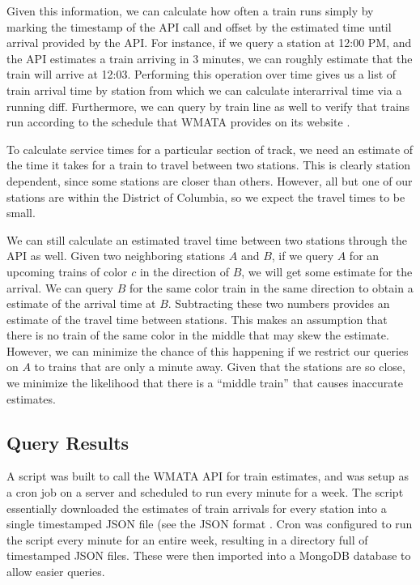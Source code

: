 \documentclass[a4paper,12pt]{article}
\begin{document}
Given this information, we can calculate how often a train runs simply by marking the timestamp of the API call and
offset by the estimated time until arrival provided by the API. For instance, if we query a station at 12:00 PM, and
the API estimates a train arriving in 3 minutes, we can roughly estimate that the train will arrive at 12:03.
Performing this operation over time gives us a list of train arrival time by station from which we can calculate
interarrival time via a running diff. Furthermore, we can query by train line as well to verify that trains run
according to the schedule that WMATA provides on its website \cite{metroschedule}.

To calculate service times for a particular section of track, we need an estimate of the time it takes for a train to
travel between two stations. This is clearly station dependent, since some stations are closer than others. However,
all but one of our stations are within the District of Columbia, so we expect the travel times to be small.

We can still calculate an estimated travel time between two stations through the API as well. Given two neighboring stations $A$ and $B$, if
we query $A$ for an upcoming trains of color $c$ in the direction of $B$, we will get some estimate for the arrival. We
can query $B$ for the same color train in the same direction to obtain a estimate of the arrival time at $B$.
Subtracting these two numbers provides an estimate of the travel time between stations. This makes an assumption that
there is no train of the same color in the middle that may skew the estimate. However, we can minimize the chance of
this happening if we restrict our queries on $A$ to trains that are only a minute away. Given that the stations are so
close, we minimize the likelihood that there is a ``middle train'' that causes inaccurate estimates.

\subsection{Query Results}
A script was built to call the WMATA API for train estimates, and was setup as a cron job on a server and scheduled to
run every minute for a week. The script
essentially downloaded the estimates of train arrivals for every station into a single timestamped JSON file (see the
JSON format \cite{json}. Cron \cite{crontab} was configured to run the script every minute for an entire week,
resulting in a directory full of timestamped JSON files. These were then imported into a MongoDB \cite{mongodb} database 
to allow easier queries.
\end{document}
